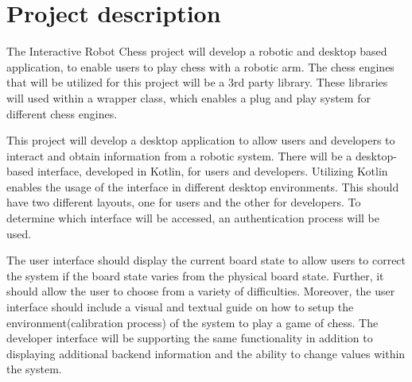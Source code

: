 \documentclass[11pt,fleqn,twoside]{article}
\begin{document}

\mmp

\setcounter{tocdepth}{4} %


\section{Project description}
The Interactive Robot Chess project will develop a robotic and desktop based application, to enable users to 
play chess with a robotic arm. The chess engines that will be utilized for this project will be a 3rd party library. 
These libraries will used within a wrapper class, which enables a plug and play system for different chess engines.\newline

\noindent This project will develop a desktop application to allow users and developers to interact and obtain 
information from a robotic system. There will be a desktop-based interface, developed in Kotlin\cite{kotlin}, for users 
and developers. Utilizing Kotlin enables the usage of the interface in different desktop environments. 
This should have two different layouts, one for users and the other for developers. To determine which interface will be 
accessed, an authentication process will be used.\newline

\noindent The user interface should display the current board state to allow users to correct the system if the board 
state varies from the physical board state. Further, it should allow the user to choose from a variety of difficulties. 
Moreover, the user interface should include a visual and textual guide on how to setup the environment(calibration process) 
of the system to play a game of chess. The developer interface will be supporting the same functionality in addition to 
displaying additional backend information and the ability to change values within the system.\newline
\end{document}
